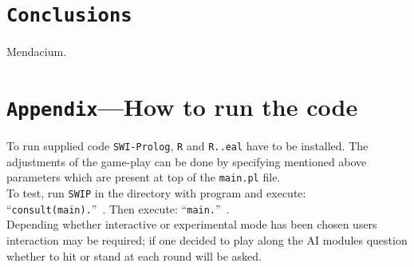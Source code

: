 \documentclass[12pt,a4paper,twocolumn]{article}
\begin{document}
\section*{\texttt{Conclusions}}
Mendacium.

\section*{\texttt{Appendix}---How to run the code}
To run supplied code \texttt{SWI-Prolog}, \texttt{R} and \texttt{R..eal} have to be installed. The adjustments of the game-play can be done by specifying mentioned above parameters which are present at top of the \texttt{main.pl} file.\\
To test, run \texttt{SWIP} in the directory with program and execute: ``\texttt{consult(main).}''~. Then execute: ``\texttt{main.}''~.\\
Depending whether interactive or experimental mode has been chosen users interaction may be required; if one decided to play along the AI modules question whether to hit or stand at each round will be asked.\\




\end{document}
